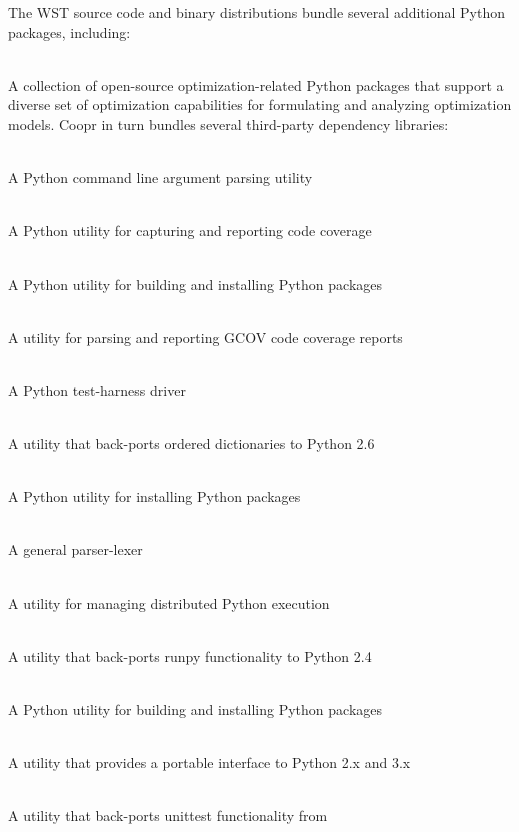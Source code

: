 The WST source code and binary distributions bundle several additional
Python packages, including:
\begin{description}[topsep=0pt,parsep=0.5em,itemsep=-0.4em,labelindent=2em,leftmargin=4em]
\item[Coopr]\hfill\\ A collection of open-source optimization-related
  Python packages that support a diverse set of optimization
  capabilities for formulating and analyzing optimization models. Coopr
  in turn bundles several third-party dependency libraries:
  \begin{description}[topsep=0pt,parsep=0.5em,itemsep=-0.4em]
  \item[argparse]\hfill\\ A Python command line argument parsing utility
  \item[coverage]\hfill\\ A Python utility for capturing and reporting
    code coverage
  \item[distribute]\hfill\\ A Python utility for building and installing
    Python packages
  \item[gcovr]\hfill\\ A utility for parsing and reporting GCOV code
    coverage reports
  \item[nose]\hfill\\ A Python test-harness driver
  \item[ordereddict]\hfill\\ A utility that back-ports ordered
    dictionaries to Python 2.6
  \item[pip]\hfill\\ A Python utility for installing Python packages
  \item[ply]\hfill\\ A general parser-lexer
  \item[pyro]\hfill\\ A utility for managing distributed Python execution
  \item[runpy2]\hfill\\ A utility that back-ports runpy functionality to Python 2.4
  \item[setuptools]\hfill\\ A Python utility for building and installing Python packages
  \item[six]\hfill\\ A utility that provides a portable interface to Python 2.x
    and 3.x
  \item[unittest2]\hfill\\ A utility that back-ports unittest functionality from

\end{description}
\end{description}
